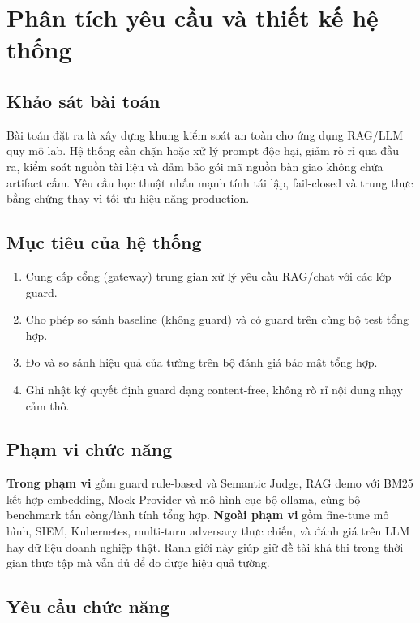 \chapter{Phân tích yêu cầu và thiết kế hệ thống}
\label{ch:phan-tich-thiet-ke}

\section{Khảo sát bài toán}

Bài toán đặt ra là xây dựng khung kiểm soát an toàn cho ứng dụng RAG/LLM quy mô lab. Hệ thống cần chặn hoặc xử lý prompt độc hại, giảm rò rỉ qua đầu ra, kiểm soát nguồn tài liệu và đảm bảo gói mã nguồn bàn giao không chứa artifact cấm. Yêu cầu học thuật nhấn mạnh tính tái lập, fail-closed và trung thực bằng chứng thay vì tối ưu hiệu năng production.

\section{Mục tiêu của hệ thống}

\begin{enumerate}
    \item Cung cấp cổng (gateway) trung gian xử lý yêu cầu RAG/chat với các lớp guard.
    \item Cho phép so sánh baseline (không guard) và có guard trên cùng bộ test tổng hợp.
    \item Đo và so sánh hiệu quả của tường trên bộ đánh giá bảo mật tổng hợp.
    \item Ghi nhật ký quyết định guard dạng content-free, không rò rỉ nội dung nhạy cảm thô.
\end{enumerate}

\section{Phạm vi chức năng}

\textbf{Trong phạm vi} gồm guard rule-based và Semantic Judge, RAG demo với BM25 kết hợp embedding, Mock Provider và mô hình cục bộ ollama, cùng bộ benchmark tấn công/lành tính tổng hợp. \textbf{Ngoài phạm vi} gồm fine-tune mô hình, SIEM, Kubernetes, multi-turn adversary thực chiến, và đánh giá trên LLM hay dữ liệu doanh nghiệp thật. Ranh giới này giúp giữ đề tài khả thi trong thời gian thực tập mà vẫn đủ để đo được hiệu quả tường.

\section{Yêu cầu chức năng}

